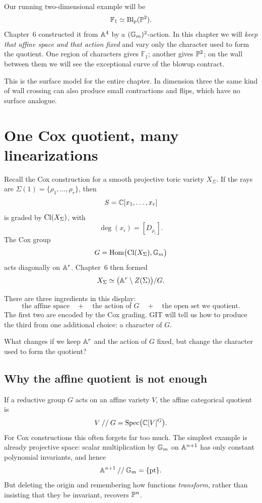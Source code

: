 \begin{surfacelaboratory}
Our running two-dimensional example will be
\[
\mathbb F_1\simeq\operatorname{Bl}_p(\mathbb{P}^2).
\]
Chapter~6 constructed it from \(\mathbb{A}^4\) by a \((\mathbb{G}_{m})^2\)-action.  In
this chapter we will \emph{keep that affine space and that action fixed}
and vary only the character used to form the quotient.  One region of
characters gives \(\mathbb F_1\); another gives \(\mathbb{P}^2\); on the wall
between them we will see the exceptional curve of the blowup contract.

This is the surface model for the entire chapter.  In dimension three
the same kind of wall crossing can also produce small contractions and
flips, which have no surface analogue.
\end{surfacelaboratory}

\section{One Cox quotient, many linearizations}
\label{sec:one-cox-many-linearizations}

Recall the Cox construction for a smooth projective toric variety
\(X_\Sigma\).  If the rays are
\(\Sigma(1)=\{\rho_1,\dots,\rho_r\}\), then
\[
S=\mathbb{C}[x_1,\dots,x_r]
\]
is graded by \(\operatorname{Cl}(X_\Sigma)\), with
\[
\deg(x_i)=[D_{\rho_i}].
\]
The Cox group
\[
G=\operatorname{Hom}\bigl(\operatorname{Cl}(X_\Sigma),\mathbb{G}_{m}\bigr)
\]
acts diagonally on \(\mathbb{A}^r\).  Chapter~6 then formed
\[
X_\Sigma
\simeq
\bigl(\mathbb{A}^r\setminus Z(\Sigma)\bigr)/G.
\]

There are three ingredients in this display:
\[
\boxed{
\text{the affine space}
\quad+\quad
\text{the action of }G
\quad+\quad
\text{the open set we quotient}.}
\]
The first two are encoded by the Cox grading.  GIT will tell us how to
produce the third from one additional choice: a character of \(G\).

\begin{guidingquestion}
What changes if we keep \(\mathbb{A}^r\) and the action of \(G\) fixed, but
change the character used to form the quotient?
\end{guidingquestion}

\subsection{Why the affine quotient is not enough}

If a reductive group \(G\) acts on an affine variety \(V\), the affine
categorical quotient is
\[
V\mathbin{//}G=\operatorname{Spec}\bigl(\mathbb{C}[V]^G\bigr).
\]
For Cox constructions this often forgets far too much.  The simplest
example is already projective space: scalar multiplication by \(\mathbb{G}_{m}\)
on \(\mathbb{A}^{n+1}\) has only constant polynomial invariants, and hence
\[
\mathbb{A}^{n+1}\mathbin{//}\mathbb{G}_{m}=\{\mathrm{pt}\}.
\]
But deleting the origin and remembering how functions \emph{transform},
rather than insisting that they be invariant, recovers \(\mathbb{P}^n\).

